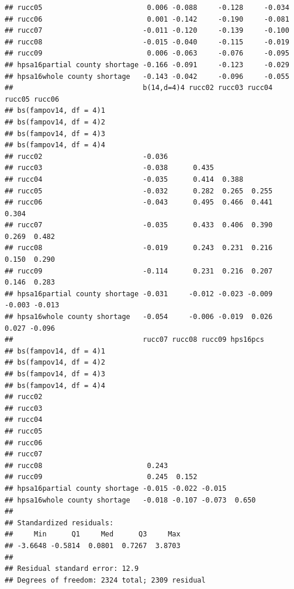 \documentclass[
]{article}
\begin{document}
\begin{verbatim}
## rucc05                         0.006 -0.088     -0.128     -0.034    
## rucc06                         0.001 -0.142     -0.190     -0.081    
## rucc07                        -0.011 -0.120     -0.139     -0.100    
## rucc08                        -0.015 -0.040     -0.115     -0.019    
## rucc09                         0.006 -0.063     -0.076     -0.095    
## hpsa16partial county shortage -0.166 -0.091     -0.123     -0.029    
## hpsa16whole county shortage   -0.143 -0.042     -0.096     -0.055    
##                               b(14,d=4)4 rucc02 rucc03 rucc04 rucc05 rucc06
## bs(fampov14, df = 4)1                                                      
## bs(fampov14, df = 4)2                                                      
## bs(fampov14, df = 4)3                                                      
## bs(fampov14, df = 4)4                                                      
## rucc02                        -0.036                                       
## rucc03                        -0.038      0.435                            
## rucc04                        -0.035      0.414  0.388                     
## rucc05                        -0.032      0.282  0.265  0.255              
## rucc06                        -0.043      0.495  0.466  0.441  0.304       
## rucc07                        -0.035      0.433  0.406  0.390  0.269  0.482
## rucc08                        -0.019      0.243  0.231  0.216  0.150  0.290
## rucc09                        -0.114      0.231  0.216  0.207  0.146  0.283
## hpsa16partial county shortage -0.031     -0.012 -0.023 -0.009 -0.003 -0.013
## hpsa16whole county shortage   -0.054     -0.006 -0.019  0.026  0.027 -0.096
##                               rucc07 rucc08 rucc09 hps16pcs
## bs(fampov14, df = 4)1                                      
## bs(fampov14, df = 4)2                                      
## bs(fampov14, df = 4)3                                      
## bs(fampov14, df = 4)4                                      
## rucc02                                                     
## rucc03                                                     
## rucc04                                                     
## rucc05                                                     
## rucc06                                                     
## rucc07                                                     
## rucc08                         0.243                       
## rucc09                         0.245  0.152                
## hpsa16partial county shortage -0.015 -0.022 -0.015         
## hpsa16whole county shortage   -0.018 -0.107 -0.073  0.650  
## 
## Standardized residuals:
##     Min      Q1     Med      Q3     Max 
## -3.6648 -0.5814  0.0801  0.7267  3.8703 
## 
## Residual standard error: 12.9 
## Degrees of freedom: 2324 total; 2309 residual
\end{verbatim}
\end{document}
